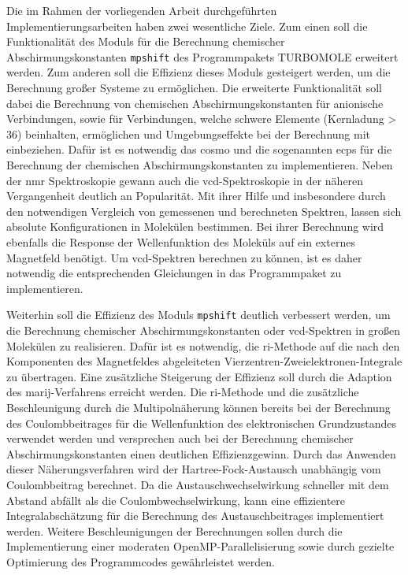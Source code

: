 \bigskip
Die im Rahmen der vorliegenden Arbeit durchgeführten Implementierungsarbeiten haben zwei wesentliche Ziele. Zum einen soll die Funktionalität des Moduls für die Berechnung chemischer Abschirmungskonstanten \texttt{mpshift}\supercite{haser1992direct,kollwitz1996direct} des Programmpakets \textsc{TURBOMOLE}\supercite{ahlrichs1989electronic,TURBOMOLE,furche2014turbomole} erweitert werden. Zum anderen soll die Effizienz dieses Moduls gesteigert werden, um die Berechnung großer Systeme zu ermöglichen. Die erweiterte Funktionalität soll dabei die Berechnung von chemischen Abschirmungskonstanten für anionische Verbindungen, sowie für Verbindungen, welche schwere Elemente (Kernladung > 36) beinhalten, ermöglichen und Umgebungseffekte bei der Berechnung mit einbeziehen. Dafür ist es notwendig das \ac{cosmo}\supercite{klamt1993cosmo} und die sogenannten \acp{ecp} für die Berechnung der chemischen Abschirmungskonstanten zu implementieren. Neben der \ac{nmr} Spektroskopie gewann auch die \ac{vcd}-Spektroskopie in der näheren Vergangenheit deutlich an Popularität. Mit ihrer Hilfe und insbesondere durch den notwendigen Vergleich von gemessenen und berechneten Spektren, lassen sich absolute Konfigurationen in Molekülen bestimmen. Bei ihrer Berechnung wird ebenfalls die Response der Wellenfunktion des Moleküls auf ein externes Magnetfeld benötigt. Um \ac{vcd}-Spektren berechnen zu können, ist es daher notwendig die entsprechenden Gleichungen in das Programmpaket zu implementieren. 

Weiterhin soll die Effizienz des Moduls \texttt{mpshift} deutlich verbessert werden, um die Berechnung chemischer Abschirmungskonstanten oder \ac{vcd}-Spektren in großen Molekülen zu realisieren. Dafür ist es notwendig, die \ac{ri}-Methode auf die nach den Komponenten des Magnetfeldes abgeleiteten Vierzentren-Zweielektronen-Integrale zu übertragen. Eine zusätzliche Steigerung der Effizienz soll durch die Adaption des \ac{marij}-Verfahrens\supercite{sierka2003fast} erreicht werden. Die \ac{ri}-Methode und die zusätzliche Beschleunigung durch die Multipolnäherung können bereits bei der Berechnung des Coulombbeitrages für die Wellenfunktion des elektronischen Grundzustandes verwendet werden und versprechen auch bei der Berechnung chemischer Abschirmungskonstanten einen deutlichen Effizienzgewinn. Durch das Anwenden dieser Näherungsverfahren wird der Hartree-Fock-Austausch unabhängig vom Coulombbeitrag berechnet. Da die Austauschwechselwirkung schneller mit dem Abstand abfällt als die Coulombwechselwirkung, kann eine effizientere Integralabschätzung für die Berechnung des Austauschbeitrages implementiert werden. Weitere Beschleunigungen der Berechnungen sollen durch die Implementierung einer moderaten OpenMP-Parallelisierung sowie durch gezielte Optimierung des Programmcodes gewährleistet werden. 

